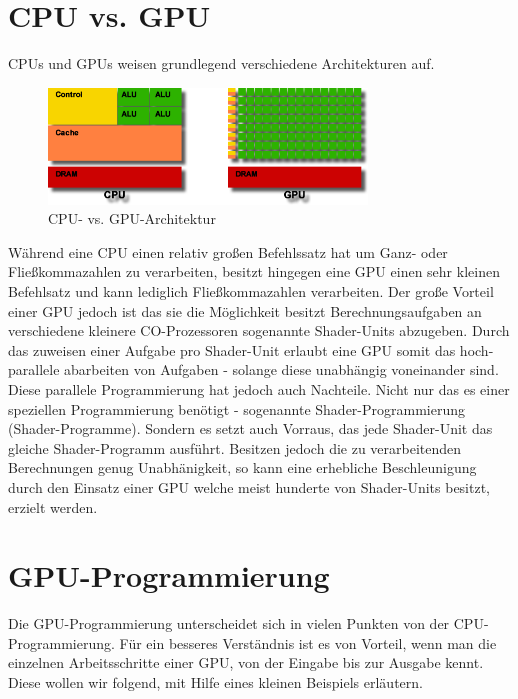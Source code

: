 \begin{Spacing}{\mylinespace}
\section{CPU vs. GPU}
CPUs und GPUs weisen grundlegend verschiedene Architekturen auf.
\begin{figure}[h!]
	\vspace*{30px}
	\centering
	\includegraphics[width=320px]{graphics/GPUvsCPU.png}	
	\caption{CPU- vs. GPU-Architektur}
	\label{fig:GPUvsCPU}
\end{figure}

Während eine CPU einen relativ großen Befehlssatz hat um Ganz- oder Fließkommazahlen zu verarbeiten, besitzt hingegen eine GPU einen sehr kleinen Befehlsatz und kann lediglich Fließkommazahlen verarbeiten.
Der große Vorteil einer GPU jedoch ist das sie die Möglichkeit besitzt Berechnungsaufgaben an verschiedene kleinere CO-Prozessoren sogenannte Shader-Units abzugeben.
Durch das zuweisen einer Aufgabe pro Shader-Unit erlaubt eine GPU somit das hoch-parallele abarbeiten von Aufgaben - solange diese unabhängig voneinander sind.
Diese parallele Programmierung hat jedoch auch Nachteile.
Nicht nur das es einer speziellen Programmierung benötigt - sogenannte Shader-Programmierung (Shader-Programme).
Sondern es setzt auch Vorraus, das jede Shader-Unit das gleiche Shader-Programm ausführt. Besitzen jedoch die zu verarbeitenden Berechnungen genug Unabhänigkeit, so kann eine erhebliche Beschleunigung durch den Einsatz einer GPU welche meist hunderte von Shader-Units besitzt, erzielt werden.


\section{GPU-Programmierung}

Die GPU-Programmierung unterscheidet sich in vielen Punkten von der CPU-Programmierung. Für ein besseres Verständnis ist es von Vorteil, wenn man die einzelnen Arbeitsschritte einer GPU, von der Eingabe bis zur Ausgabe kennt. Diese wollen wir folgend, mit Hilfe eines kleinen Beispiels erläutern.


\end{Spacing}
